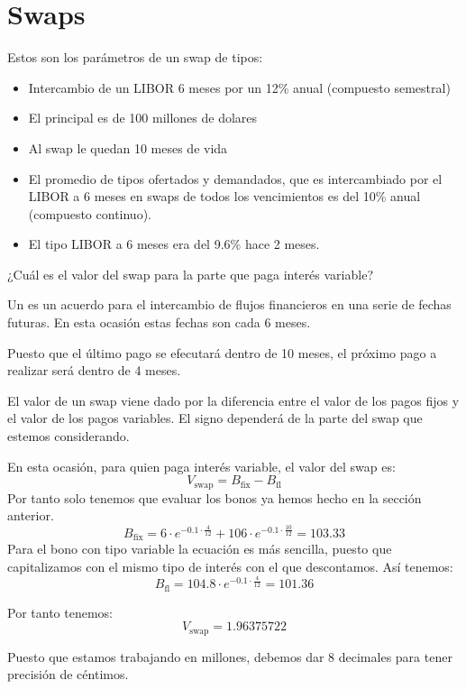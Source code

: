 \section{Swaps}
\begin{problem}[1]
Estos son los parámetros de un swap de tipos:
\begin{itemize}
\item Intercambio de un LIBOR 6 meses por un 12\% anual (compuesto semestral)
\item El principal es de 100 millones de dolares
\item Al swap le quedan 10 meses de vida
\item El promedio de tipos ofertados y demandados, que es intercambiado por el LIBOR
a 6 meses en swaps de todos los vencimientos es del 10\% anual (compuesto continuo).
\item El tipo LIBOR a 6 meses era del 9.6\% hace 2 meses.
\end{itemize}
¿Cuál es el valor del swap para la parte que paga interés variable?
\solution
{}

Un  es un acuerdo para el intercambio de flujos financieros en una serie
de fechas futuras. En esta ocasión estas fechas son cada 6 meses.

Puesto que el último pago se efecutará dentro de 10 meses, el próximo pago a realizar será
dentro de 4 meses.

El valor de un swap viene dado por la diferencia entre el valor de los pagos fijos y el valor
de los pagos variables. El signo dependerá de la parte del swap que estemos considerando.

En esta ocasión, para quien paga interés variable, el valor del swap es:
\[V_{\text{swap}} = B_{\text{fix}} - B_{\text{fl}}\]
Por tanto solo tenemos que evaluar los bonos ya hemos hecho en la sección anterior.
\[B_{\text{fix}} = 6\cdot e^{-0.1\cdot \frac{4}{12}} + 106 \cdot e^{-0.1\cdot \frac{10}{12}} = 103.33\]
Para el bono con tipo variable la ecuación es más sencilla, puesto que capitalizamos con el mismo tipo
de interés con el que descontamos. Así tenemos:
\[B_{\text{fl}} = 104.8\cdot e^{-0.1\cdot \frac{4}{12}} = 101.36\]

Por tanto tenemos:
\[V_{\text{swap}} = 1.96375722\]

Puesto que estamos trabajando en millones, debemos dar 8 decimales para tener precisión de céntimos.
\end{problem}

